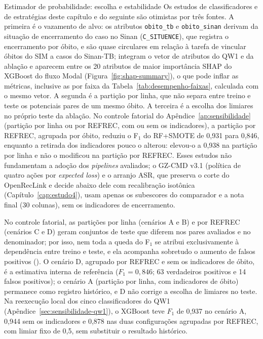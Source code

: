 \begin{chapter}{Estimador de probabilidade: escolha e estabilidade}
Os estudos de classificadores e de estratégias deste capítulo e do seguinte são otimistas por três fontes. A primeira é o vazamento de alvo: os atributos \texttt{obito\_tb} e \texttt{obito\_sinan} derivam da situação de encerramento do caso no Sinan (\texttt{C\_SITUENCE}), que registra o encerramento por óbito, e são quase circulares em relação à tarefa de vincular óbitos do SIM a casos do Sinan-TB; integram o vetor de atributos do QW1 e da ablação e aparecem entre os 20 atributos de maior importância SHAP do XGBoost do fluxo Modal (Figura~\ref{fig:shap-summary}), o que pode inflar as métricas, inclusive as por faixa da Tabela~\ref{tab:desempenho-faixas}, calculada com o mesmo vetor. A segunda é a partição por linha, que não separa entre treino e teste os potenciais pares de um mesmo óbito. A terceira é a escolha dos limiares no próprio teste da ablação. No controle fatorial do Apêndice~\ref{ap:sensibilidade} (partição por linha ou por REFREC, com ou sem os indicadores), a partição por REFREC, agrupada por óbito, reduziu o F$_1$ do RF+SMOTE de 0,931 para 0,846, enquanto a retirada dos indicadores pouco o alterou: elevou-o a 0,938 na partição por linha e não o modificou na partição por REFREC. Esses estudos não fundamentam a adoção dos \textit{pipelines} avaliados; o GZ-CMD v3.1 (política de quatro ações por \textit{expected loss}) e o arranjo ASR, que preserva o corte do OpenRecLink e decide abaixo dele com recalibração isotônica (Capítulo~\ref{cap:estudo4}), usam apenas os subescores do comparador e a nota final (30 colunas), sem os indicadores de encerramento.

No controle fatorial, as partições por linha (cenários A e B) e por REFREC (cenários C e D) geram conjuntos de teste que diferem nos pares avaliados e no denominador; por isso, nem toda a queda do F$_1$ se atribui exclusivamente à dependência entre treino e teste, e ela acompanha sobretudo o aumento de falsos positivos (). O cenário D, agrupado por REFREC e sem os indicadores de óbito, é a estimativa interna de referência ($F_1 = 0{,}846$; 63 verdadeiros positivos e 14 falsos positivos); o cenário A (partição por linha, com indicadores de óbito) permanece como registro histórico, e D não corrige a escolha de limiares no teste. Na reexecução local dos cinco classificadores do QW1 (Apêndice~\ref{sec:sensibilidade-qw1}), o XGBoost teve $F_1$ de 0,937 no cenário A, 0,944 sem os indicadores e 0,878 nas duas configurações agrupadas por REFREC, com limiar fixo de 0,5, sem substituir o resultado histórico.


\end{chapter}
